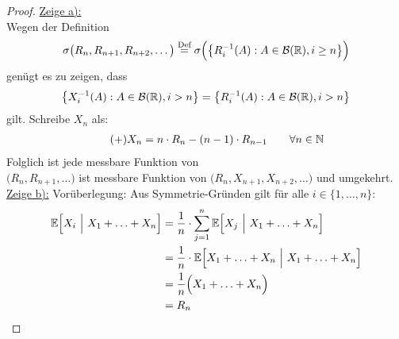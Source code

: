 \begin{proof}
	\underline{Zeige a):}\\
	Wegen der Definition
	\begin{align*}
		\sigma\big(R_n,R_{n+1},R_{n+2},\ldots\big)
		\overset{\text{Def}}{=}\sigma\Big(\big\lbrace R_i^{-1}(A):A\in\mathcal{B}(\mathbb{R}),i\geq n\big\rbrace\Big)
	\end{align*}
	genügt es zu zeigen, dass 
	\begin{align*}
		\left\lbrace X_i^{-1}(A):A\in\mathcal{B}(\mathbb{R}),i>n\right\rbrace=\left\lbrace R_i^{-1}(A):A\in\mathcal{B}(\mathbb{R}),i>n\right\rbrace
	\end{align*}
	gilt. Schreibe $X_n$ als:
	\begin{align}\label{eqAufgabe1Plus}\tag{+}
		X_n=n\cdot R_n-(n-1)\cdot R_{n-1}\qquad\forall n\in\mathbb{N}
	\end{align}
	Folglich ist jede messbare Funktion von\\ $\big(R_n,R_{n+1},\ldots\big)$ ist messbare Funktion von $\big(R_n,X_{n+1},X_{n+2},\ldots\big)$ und umgekehrt.\nl
	\underline{Zeige b):}
	Vorüberlegung: Aus Symmetrie-Gründen gilt für alle $i\in\lbrace1,\ldots,n\rbrace$:
	\begin{align*}
		\mathbb{E}\Big[X_i~\Big|~X_1+\ldots+X_n\Big]
		&=\frac{1}{n}\cdot\sum\limits_{j=1}^n\mathbb{E}\Big[X_j~\Big|~X_1+\ldots+X_n\Big]\\
		&=\frac{1}{n}\cdot\mathbb{E}\Big[X_1+\ldots+X_n~\Big|~X_1+\ldots+X_n\Big]\\
		&=\frac{1}{n}\Big(X_1+\ldots+X_n\Big)\\
		&=R_n
	\end{align*}		
	

\end{proof}

